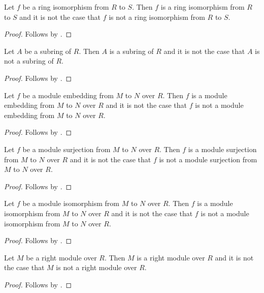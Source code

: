 \begin{proposition}\label{spike_use_ring_isomorphism}
    Let $f$ be a ring isomorphism from $R$ to $S$.
    Then $f$ is a ring isomorphism from $R$ to $S$ and it is not the case
        that $f$ is not a ring isomorphism from $R$ to $S$.
\end{proposition}
\begin{proof} Follows by \auto. \end{proof}

\begin{proposition}\label{spike_use_subring}
    Let $A$ be a subring of $R$.
    Then $A$ is a subring of $R$ and it is not the case that
        $A$ is not a subring of $R$.
\end{proposition}
\begin{proof} Follows by \auto. \end{proof}

\begin{proposition}\label{spike_use_module_embedding}
    Let $f$ be a module embedding from $M$ to $N$ over $R$.
    Then $f$ is a module embedding from $M$ to $N$ over $R$ and
        it is not the case that
            $f$ is not a module embedding from $M$ to $N$ over $R$.
\end{proposition}
\begin{proof} Follows by \auto. \end{proof}

\begin{proposition}\label{spike_use_module_surjection}
    Let $f$ be a module surjection from $M$ to $N$ over $R$.
    Then $f$ is a module surjection from $M$ to $N$ over $R$ and
        it is not the case that
            $f$ is not a module surjection from $M$ to $N$ over $R$.
\end{proposition}
\begin{proof} Follows by \auto. \end{proof}

\begin{proposition}\label{spike_use_module_isomorphism}
    Let $f$ be a module isomorphism from $M$ to $N$ over $R$.
    Then $f$ is a module isomorphism from $M$ to $N$ over $R$ and
        it is not the case that
            $f$ is not a module isomorphism from $M$ to $N$ over $R$.
\end{proposition}
\begin{proof} Follows by \auto. \end{proof}

\begin{proposition}\label{spike_use_right_module}
    Let $M$ be a right module over $R$.
    Then $M$ is a right module over $R$ and it is not the case that
        $M$ is not a right module over $R$.
\end{proposition}
\begin{proof} Follows by \auto. \end{proof}

